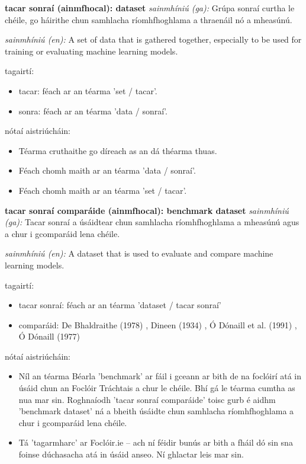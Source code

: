 \documentclass{article}
\begin{document}
\textbf{tacar sonraí (ainmfhocal): dataset}
\textit{sainmhíniú (ga):} Grúpa sonraí curtha le chéile, go háirithe chun samhlacha ríomhfhoghlama a thraenáil nó a mheasúnú.

\textit{sainmhíniú (en):} A set of data that is gathered together, especially to be used for training or evaluating machine learning models.

tagairtí:
\begin{itemize}
	\item tacar: féach ar an téarma 'set / tacar'.
	\item sonra: féach ar an téarma 'data / sonraí'.
\end{itemize}

nótaí aistriúcháin:
\begin{itemize}
	\item Téarma cruthaithe go díreach as an dá théarma thuas.
	\item Féach chomh maith ar an téarma 'data / sonraí'.
	\item Féach chomh maith ar an téarma 'set / tacar'.
\end{itemize}


\textbf{tacar sonraí comparáide (ainmfhocal): benchmark dataset}
\textit{sainmhíniú (ga):} Tacar sonraí a úsáidtear chun samhlacha ríomhfhoghlama a mheasúnú agus a chur i gcomparáid lena chéile.

\textit{sainmhíniú (en):} A dataset that is used to evaluate and compare machine learning models.

tagairtí:
\begin{itemize}
	\item tacar sonraí: féach ar an téarma 'dataset / tacar sonraí'
	\item comparáid: De Bhaldraithe (1978) \cite{de-bhaldraithe}, Dineen (1934) \cite{dineen}, Ó Dónaill et al. (1991) \cite{focloir-beag}, Ó Dónaill (1977) \cite{odonaill}
\end{itemize}

nótaí aistriúcháin:
\begin{itemize}
	\item Níl an téarma Béarla 'benchmark' ar fáil i gceann ar bith de na foclóirí atá in úsáid chun an Foclóir Tráchtais a chur le chéile. Bhí gá le téarma cumtha as nua mar sin. Roghnaíodh 'tacar sonraí comparáide' toisc gurb é aidhm 'benchmark dataset' ná a bheith úsáidte chun samhlacha ríomhfhoghlama a chur i gcomparáid lena chéile.
	\item Tá 'tagarmharc' ar Foclóir.ie -- ach ní féidir bunús ar bith a fháil dó sin sna foinse dúchasacha atá in úsáid anseo. Ní ghlactar leis mar sin.
\end{itemize}
\end{document}
